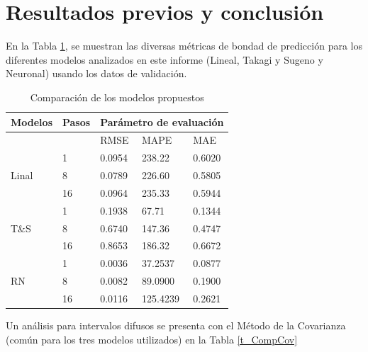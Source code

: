 \documentclass[12pt]{article}
\begin{document}
\clearpage
\newpage




\newpage
\section{Resultados previos y conclusión}

En la Tabla \ref{t_Comp}, se muestran las diversas métricas de bondad de predicción para los diferentes modelos analizados en este informe (Lineal, Takagi y Sugeno y Neuronal) usando los datos de validación.

\begin{table}[htbp]
  \centering
  \caption{Comparación de los modelos propuestos}
\begin{tabular}{|l|l|l|l|l|}
	\hline
	Modelos                & Pasos & \multicolumn{3}{l|}{Parámetro de evaluación} \\ \hline
	\multicolumn{2}{|l|}{}         & RMSE         & MAPE           & MAE          \\ \hline
	\multirow{3}{*}{Linal} & 1     & 0.0954       & 238.22         & 0.6020       \\ \cline{2-5}
	& 8     & 0.0789       & 226.60         & 0.5805       \\ \cline{2-5}
	& 16    & 0.0964       & 235.33         & 0.5944       \\ \hline
	\multirow{3}{*}{T\&S}  & 1     & 0.1938       & 67.71          & 0.1344       \\ \cline{2-5}
	& 8     & 0.6740       & 147.36         & 0.4747       \\ \cline{2-5}
	& 16    & 0.8653       & 186.32         & 0.6672       \\ \hline
	\multirow{3}{*}{RN}    & 1     & 0.0036       & 37.2537        & 0.0877       \\ \cline{2-5}
	& 8     & 0.0082       & 89.0900        & 0.1900       \\ \cline{2-5}
	& 16    & 0.0116       & 125.4239       & 0.2621       \\ \hline
\end{tabular}
  \label{t_Comp}%
\end{table}%

Un análisis para intervalos difusos se presenta con el Método de la Covarianza (común para los tres modelos utilizados) en la  Tabla \ref{t_CompCov}
\end{document}
